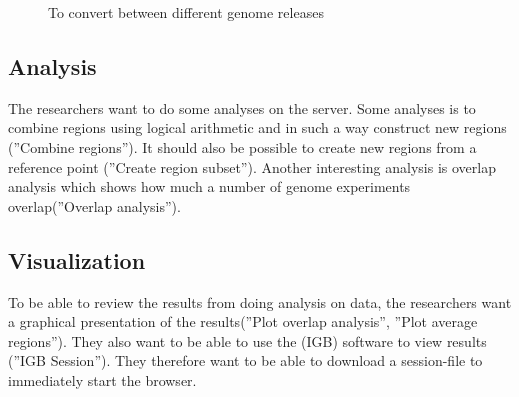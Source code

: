 \begin{figure}[h]
\caption{To convert between different genome releases}
\label{fig:target_genome}
\end{figure}

\subsection{Analysis}
The researchers want to do some analyses on the server. Some analyses is to combine regions using logical arithmetic and in such a way construct new regions (''Combine regions''). It should also be possible to create new regions from a reference point (''Create region subset''). Another interesting analysis is overlap analysis which shows how much a number of genome experiments overlap(''Overlap analysis'').

\subsection{Visualization}
To be able to review the results from doing analysis on data,  the researchers want a graphical presentation of the results(''Plot overlap analysis'', ''Plot average regions''). They also want to be able to use the  (IGB) software to view results (''IGB Session''). They therefore want to be able to download a session-file to immediately start the browser. 
